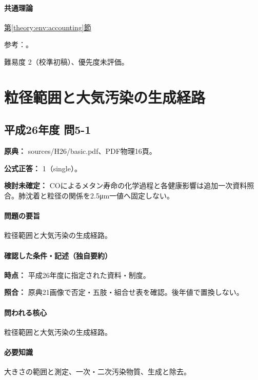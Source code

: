 \paragraph{共通理論} \hyperref[theory:env:accounting]{第\ref*{theory:env:accounting}節}

\par 参考：\cite{env58_accounting}。

\par 難易度 2（校準初稿）、優先度未評価。

\section{粒径範囲と大気汚染の生成経路}

\subsection{平成26年度 問5-1}
\label{q:h26-reg-basic-5-1}

\noindent\textbf{原典：} sources/H26/basic.pdf、PDF物理16頁。

\textbf{公式正答：} 1（single）。

\par\textbf{検討未確定：} COによるメタン寿命の化学過程と各健康影響は追加一次資料照合。肺沈着と粒径の関係を2.5μm一値へ固定しない。

\paragraph{問題の要旨} 粒径範囲と大気汚染の生成経路。

\paragraph{確認した条件・記述（独自要約）}\mbox{}\par

\noindent\textbf{時点：} 平成26年度に指定された資料・制度。\par

\noindent\textbf{照合：} 原典21画像で否定・五肢・組合せ表を確認。後年値で置換しない。\par

\paragraph{問われる核心} 粒径範囲と大気汚染の生成経路。

\paragraph{必要知識} 大きさの範囲と測定、一次・二次汚染物質、生成と除去。

